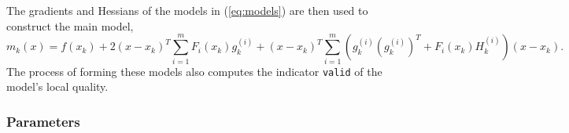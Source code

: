 The gradients and Hessians of the models in (\ref{eq:models}) are then
used to construct the main model, 
\begin{equation}
m_k(x) = f(x_k) + 
2(x-x_k)^T \sum_{i=1}^{m} F_i(x_k) g_k^{(i)} +
(x-x_k)^T \sum_{i=1}^{m}
\left( g_k^{(i)} \left(g_k^{(i)}\right)^T +  F_i(x_k)
H_k^{(i)}\right) (x-x_k).
 \label{eq:newton2}
\end{equation}
The process of forming these models also computes the indicator
\texttt{valid} of the model's local quality.


\subsubsection{Parameters}
\begin{comment}
If evaluations of the residual vector $F$ are available, then this can be
input and will often result in improved performance. Assuming that
\texttt{nfs}$>0$ such points are available, then the user should input the
matrix of locations \texttt{X0} $=[y_1, \ldots, y_{\rm nfs}]$ and the
corresponding matrix of residuals \texttt{F0} $= [F(y_1), \ldots, F(y_{\rm
nfs})]$. The user selects which one of these points is the starting point
(this is typically the point $\arg \min_{i=1,\ldots, {\rm nfs}}
\|F(y_i)\|^2$) to be used and inputs the index as the integer
\texttt{xkin}.

If no such points are available, then \texttt{nfs}$=0$, \texttt{F0} is
empty, \texttt{xkin}$=1$, and the user inputs the desired starting point
(whose residual has not yet been evaluated) as \texttt{X0} $=[x_0]$.


In addition to the inputs \texttt{nfs}, \texttt{X0}, \texttt{F0},
\texttt{xkin} above, 
\end{comment}

